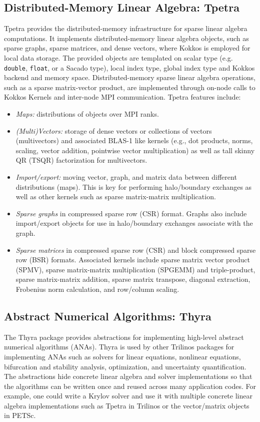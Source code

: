 \subsection{Distributed-Memory Linear Algebra: Tpetra}\label{subsec:tpetra}
Tpetra \cite{hoemmen2015tpetra} provides the distributed-memory
infrastructure for sparse linear algebra computations.  It implements
distributed-memory linear algebra objects, such as sparse graphs,
sparse matrices, and dense vectors, where Kokkos is employed for local data
storage. The provided objects are templated on scalar type (e.g. \texttt{double}, \texttt{float}, or a Sacado type), local index type, global index type and Kokkos backend and memory space.
Distributed-memory sparse linear algebra operations, such as
a sparse matrix-vector product, are implemented through on-node calls
to Kokkos Kernels and inter-node MPI communication. Tpetra features
include:
\begin{itemize}
\item \emph{Maps:} distributions of objects over MPI ranks.
\item \emph{(Multi)Vectors:} storage of dense vectors or collections of
vectors (multivectors) and associated BLAS-1 like kernels (e.g., dot
products, norms, scaling, vector addition, pointwise vector
multiplication) as well as tall skinny QR (TSQR)  factorization for multivectors.
\item \emph{Import/export:} moving vector, graph, and matrix data
between different distributions (maps). This is key for performing
halo/boundary exchanges as well as other kernels such as
sparse matrix-matrix multiplication.
\item \emph{Sparse graphs} in compressed sparse row (CSR)
format. Graphs also include import/export objects for use in
halo/boundary exchanges associate with the graph.
\item \emph{Sparse matrices} in compressed sparse row (CSR) and
block compressed sparse row (BSR) formats.  Associated kernels include
sparse matrix vector product (SPMV), sparse matrix-matrix
multiplication (SPGEMM) and triple-product, sparse matrix-matrix addition, sparse matrix transpose, diagonal extraction,
Frobenius norm calculation, and row/column scaling.
\end{itemize}

\subsection{Abstract Numerical Algorithms: Thyra}
The Thyra package provides abstractions for implementing high-level abstract numerical algorithms (ANAs). Thyra is used by other Trilinos packages for implementing ANAs such as solvers for linear equations, nonlinear equations, bifurcation and stability analysis, optimization, and uncertainty quantification. The abstractions hide concrete linear algebra and solver implementations so that the algorithms can be written once and reused across many application codes. For example, one could write a Krylov solver and use it with multiple concrete linear algebra implementations such as Tpetra in Trilinos %
or the vector/matrix objects in PETSc.

